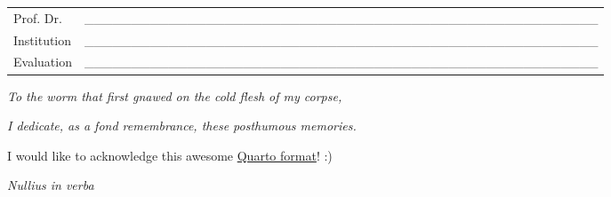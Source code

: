 \begin{folhadeaprovacao}[\folhadeaprovacaoname]
\begin{tabular}{m{2cm} P{14cm}}
  Prof. Dr. & \_\_\_\_\_\_\_\_\_\_\_\_\_\_\_\_\_\_\_\_\_\_\_\_\_\_\_\_\_\_\_\_\_\_\_\_\_\_\_\_\_\_\_\_\_\_\_\_\_\_\_\_\_\_\_ \\
  Institution & \_\_\_\_\_\_\_\_\_\_\_\_\_\_\_\_\_\_\_\_\_\_\_\_\_\_\_\_\_\_\_\_\_\_\_\_\_\_\_\_\_\_\_\_\_\_\_\_\_\_\_\_\_\_\_ \\
  Evaluation & \_\_\_\_\_\_\_\_\_\_\_\_\_\_\_\_\_\_\_\_\_\_\_\_\_\_\_\_\_\_\_\_\_\_\_\_\_\_\_\_\_\_\_\_\_\_\_\_\_\_\_\_\_\_\_ \\
\end{tabular}
\end{folhadeaprovacao}


\begin{dedicatoria}[]
  \vspace*{\fill}
  \centering
\textit{To the worm that first gnawed on the cold flesh of my corpse,}

\textit{I dedicate, as a fond remembrance, these posthumous memories.}\footnotemark{}

	\vspace*{\fill}
\end{dedicatoria}


\begin{agradecimentos}[\agradecimentosname]

I would like to acknowledge this awesome
\href{https://github.com/danielvartan/abnt}{Quarto format}! :)

\end{agradecimentos}


\begin{epigrafe}[]
  \vspace*{\fill}
	\begin{flushright}
\textit{Nullius in verba}\footnotemark{}

	\end{flushright}
\end{epigrafe}

